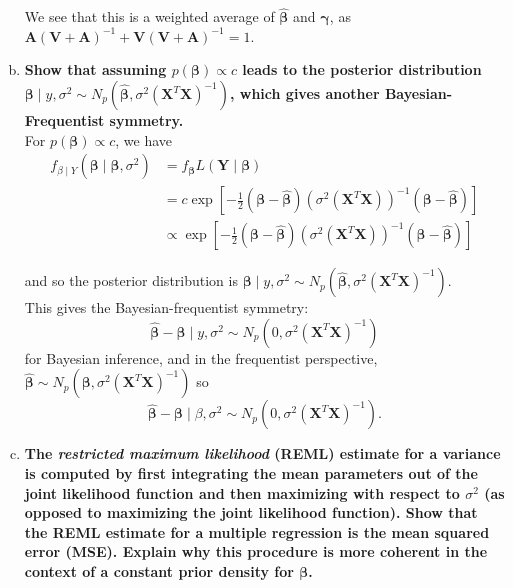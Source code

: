 \begin{enumerate}[a)]
We see that this is a weighted average of $\hat{\bm{\beta}}$ and $\bm{\gamma}$, as $\bm{A}(\bm{V} + \bm{A})^{-1} + \bm{V}(\bm{V} + \bm{A})^{-1} = 1$. 

\item \textbf{Show that assuming $p(\bm{\beta}) \propto c$ leads to the posterior distribution $\bm{\beta} \mid y, \sigma^2 \sim N_p(\hat{\bm{\beta}}, \sigma^2(\bm{X}^T\bm{X})^{-1})$, which
gives another Bayesian-Frequentist symmetry.} \\

For $p(\bm{\beta}) \propto c$, we have
\begin{align*}
    f_{\beta \mid Y}(\bm{\beta} \mid \hat{\bm{\beta}}, \sigma^2) &= f_{\bm{\beta}} L(\bm{Y} \mid \bm{\beta}) \\
    &= c \exp \left[ -\frac{1}{2} (\bm{\beta} - \hat{\bm{\beta}})\left(\sigma^2(\bm{X}^T\bm{X})\right)^{-1}(\bm{\beta} - \hat{\bm{\beta}}) \right] \\
    & \propto \exp \left[ -\frac{1}{2} (\bm{\beta} - \hat{\bm{\beta}})\left(\sigma^2(\bm{X}^T\bm{X})\right)^{-1}(\bm{\beta} - \hat{\bm{\beta}}) \right]
\end{align*}

and so the posterior distribution is $\bm{\beta} \mid y, \sigma^2 \sim N_p(\hat{\bm{\beta}}, \sigma^2(\bm{X}^T\bm{X})^{-1})$. \\

This gives the Bayesian-frequentist symmetry:
\[
    \hat{\bm{\beta}} - \bm{\beta} \mid y, \sigma^2 \sim N_p(0, \sigma^2(\bm{X}^T\bm{X})^{-1})
\]
for Bayesian inference, and in the frequentist perspective, $\hat{\bm{\beta}} \sim N_p(\bm{\beta},  \sigma^2(\bm{X}^T\bm{X})^{-1})$ so
\[
    \hat{\bm{\beta}} - \bm{\beta} \mid \beta, \sigma^2 \sim N_p(0, \sigma^2(\bm{X}^T\bm{X})^{-1}).
\]

\item \textbf{The \textit{restricted maximum likelihood} (REML) estimate for a variance is computed by first integrating the
mean parameters out of the joint likelihood function and then maximizing with respect to $\sigma^2$ (as opposed to maximizing the joint likelihood function).
Show that the REML estimate for a multiple regression is the mean squared error (MSE). Explain why this procedure
is more coherent in the context of a constant prior density for $\bm{\beta}$.}


\end{enumerate}
